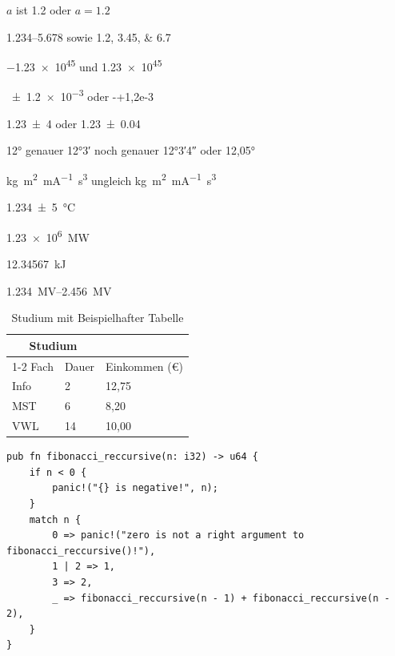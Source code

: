\documentclass[numbers=noenddot,bibliography=totoc,12pt,sfdefaults=false]{scrartcl}
\begin{document}
    $a$ ist \num{1,2} oder $a = \num{1,2}$

    \numrange{1,234}{5,678} sowie \numlist{1,2;3,45;6,7}

    \num{-1,23e45} und \num{+1,23e45}

    \num{+-1,2e-3} oder \num{-+1,2e-3}

    \num{1,23(4)} oder \num{1,23+-0,04}

    \ang{12} genauer \ang{12;3;} noch genauer \ang{12;3;4}
    oder \ang{12,05}

    \si{\kg\m\squared\per\milli\A\s\cubed} ungleich
    \si[sticky-per]{\kg\m\squared\per\milli\A\s\cubed}

    \SI{1,234(5)}{\celsius}

    \SI{1,23e6}{\mega\watt}

    \SI[round-mode = places]{12,34567}{\kJ}

    \SIrange{1,234}{2,456}{\mega\volt}

    \begin{table}[t]
        \centering
        \caption{Studium mit Beispielhafter Tabelle}
        \label{tab:my_label}
        \begin{tabularx}{.7\columnwidth}{XXX}
            \toprule
            \multicolumn{2}{c}{Studium} \\ \cmidrule{1-2}
            Fach & Dauer & Einkommen (€) \\
            \midrule
            Info & 2     & 12,75         \\
            MST  & 6     & 8,20          \\
            VWL  & 14    & 10,00         \\
            \bottomrule
        \end{tabularx}
    \end{table}

    \begin{listing}[t]
        \begin{verbatim}
pub fn fibonacci_reccursive(n: i32) -> u64 {
    if n < 0 {
        panic!("{} is negative!", n);
    }
    match n {
        0 => panic!("zero is not a right argument to fibonacci_reccursive()!"),
        1 | 2 => 1,
        3 => 2,
        _ => fibonacci_reccursive(n - 1) + fibonacci_reccursive(n - 2),
    }
}
        \end{verbatim}
        \caption{Fibonnaci Sequence Rust (nicht nach \textcite{Schilit1994_Disseminating})}
        \label{lst:fib_rust}
    \end{listing}
\end{document}
